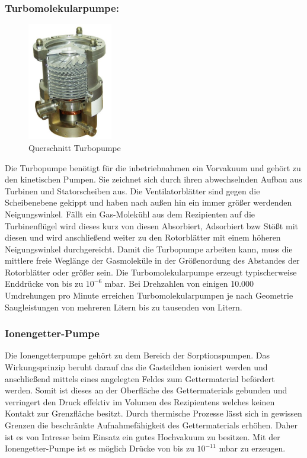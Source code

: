 \subsubsection{Turbomolekularpumpe:}
\begin{figure}
    \vspace{-1cm}
    \centering
    \includegraphics[width=0.33\textwidth]{./picture/Turbo.jpg}
    \caption{Querschnitt Turbopumpe \cite{Turbo}}
    \label{fig:Turbo}
    \vspace{-0.5cm}
\end{figure}
Die Turbopumpe benötigt für die inbetriebnahmen ein Vorvakuum und gehört zu den kinetischen Pumpen. Sie zeichnet sich durch ihren abwechselnden Aufbau aus Turbinen und Statorscheiben aus. Die Ventilatorblätter sind gegen die Scheibenebene gekippt und haben nach außen hin ein immer größer werdenden Neigungswinkel. Fällt ein Gas-Molekühl aus dem Rezipienten auf die Turbinenflügel wird dieses kurz von diesen Absorbiert, Adsorbiert bzw Stößt mit diesen und wird anschließend weiter zu den Rotorblätter mit einem höheren Neigungswinkel durchgereicht. Damit die Turbopumpe arbeiten kann, muss die mittlere freie Weglänge der Gasmoleküle in der Größenordung des Abstandes der Rotorblätter oder größer sein. Die Turbomolekularpumpe erzeugt typischerweise Enddrücke von bis zu $10^{-6}$ mbar. Bei Drehzahlen von einigen 10.000 Umdrehungen pro Minute erreichen Turbomolekularpumpen je nach Geometrie Saugleistungen von mehreren Litern bis zu tausenden von Litern.

\subsubsection{Ionengetter-Pumpe}
Die Ionengetterpumpe gehört zu dem Bereich der Sorptionspumpen. Das Wirkungsprinzip beruht darauf das die Gasteilchen ionisiert werden und anschließend mittels eines angelegten Feldes zum Gettermaterial befördert werden. Somit ist dieses an der Oberfläche des Gettermaterials gebunden und verringert den Druck effektiv im Volumen des Rezipientens welches keinen Kontakt zur Grenzfläche besitzt. Durch thermische Prozesse lässt sich in gewissen Grenzen die beschränkte Aufnahmefähigkeit des Gettermaterials erhöhen. Daher ist es von Intresse beim Einsatz ein gutes Hochvakuum zu besitzen. Mit der Ionengetter-Pumpe ist es möglich Drücke von bis zu $10^{-11}$ mbar zu erzeugen.

